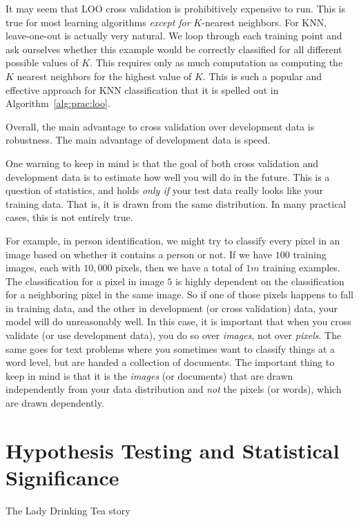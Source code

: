 It may seem that LOO cross validation is prohibitively expensive to
run.  This is true for most learning algorithms \emph{except for}
$K$-nearest neighbors.  For KNN, leave-one-out is actually very
natural.  We loop through each training point and ask ourselves
whether this example would be correctly classified for all different
possible values of $K$.  This requires only as much computation as
computing the $K$ nearest neighbors for the highest value of $K$.
This is such a popular and effective approach for KNN classification
that it is spelled out in Algorithm~\ref{alg:prac:loo}.

Overall, the main advantage to cross validation over development data
is robustness.  The main advantage of development data is speed.

One warning to keep in mind is that the goal of both cross validation
and development data is to estimate how well you will do in the
future.  This is a question of statistics, and holds \emph{only if}
your test data really looks like your training data.  That is, it is
drawn from the same distribution.  In many practical cases, this is
not entirely true.

For example, in person identification, we might try to classify every
pixel in an image based on whether it contains a person or not.  If we
have $100$ training images, each with $10,000$ pixels, then we have a
total of $1m$ training examples.  The classification for a pixel in
image $5$ is highly dependent on the classification for a neighboring
pixel in the same image.  So if one of those pixels happens to fall in
training data, and the other in development (or cross validation)
data, your model will do unreasonably well.  In this case, it is
important that when you cross validate (or use development data), you
do so over \emph{images}, not over \emph{pixels}.  The same goes for
text problems where you sometimes want to classify things at a word
level, but are handed a collection of documents.  The important thing
to keep in mind is that it is the \emph{images} (or documents) that
are drawn independently from your data distribution and \emph{not} the
pixels (or words), which are drawn dependently.

\section{Hypothesis Testing and Statistical Significance}

\begin{vignette}{The Lady Drinking Tea}
  story
\end{vignette}

